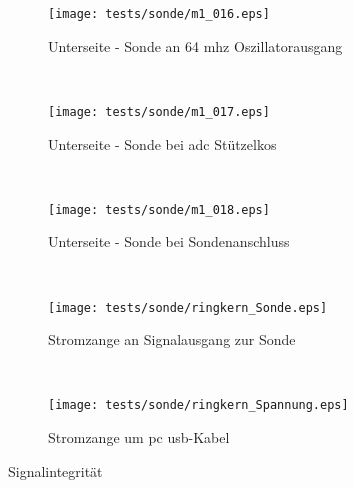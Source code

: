 \clearpage
\begin{figure}[h!]
\ContinuedFloat
        \centering
  \begin{subfigure}[t]{0.48\textwidth}
	\centering
  	\texttt{[image: tests/sonde/m1\_016.eps]}  
  	\caption{Unterseite - Sonde an 64 \ac{mhz} Oszillatorausgang}
  \label{fig:m2}
  \end{subfigure}
  ~
  \begin{subfigure}[t]{0.48\textwidth}
	\centering
  	\texttt{[image: tests/sonde/m1\_017.eps]}  
  	\caption{Unterseite - Sonde bei \ac{adc} Stützelkos}
  \label{fig:m2}
  \end{subfigure}
  ~
  \begin{subfigure}[t]{0.48\textwidth}
	\centering
  	\texttt{[image: tests/sonde/m1\_018.eps]}  
  	\caption{Unterseite - Sonde bei Sondenanschluss}
  \label{fig:m2}
  \end{subfigure}
	~
  \begin{subfigure}[t]{0.48\textwidth}
	\centering
  	\texttt{[image: tests/sonde/ringkern\_Sonde.eps]}  
  	\caption{Stromzange an Signalausgang zur Sonde}
  \label{fig:strom_sonde}
  \end{subfigure}
  ~
  \begin{subfigure}[t]{0.48\textwidth}
	\centering
  	\texttt{[image: tests/sonde/ringkern\_Spannung.eps]}  
  	\caption{Stromzange um \acs{pc} \acs{usb}-Kabel}
  \label{fig:strom_spannung}
  \end{subfigure}  
  \caption{Signalintegrität}
  \label{fig:signal_int}
\end{figure}
\clearpage
